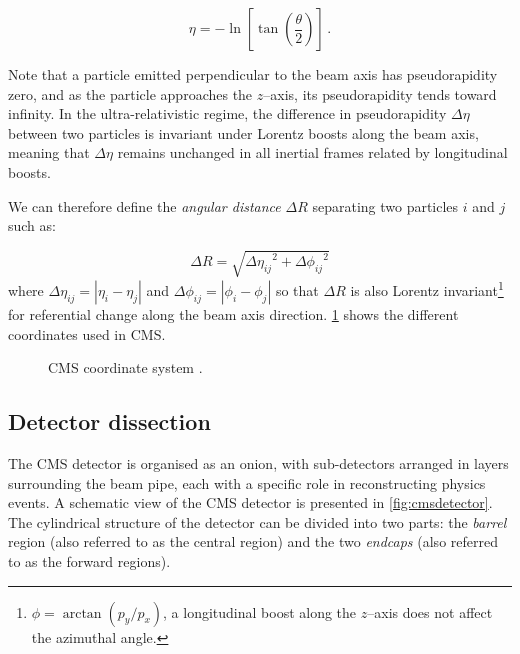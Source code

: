 \begin{equation}
    \eta = - \ln \left[ \tan \left( \frac{\theta}{2} \right) \right] \, .
    \label{eq:pseudorapidity}
\end{equation}

Note that a particle emitted perpendicular to the beam axis has pseudorapidity zero, and as the particle approaches the $z$--axis, its pseudorapidity tends toward infinity. In the ultra-relativistic regime, the difference in pseudorapidity $\Delta \eta$ between two particles is invariant under Lorentz boosts along the beam axis, meaning that $\Delta \eta$ remains unchanged in all inertial frames related by longitudinal boosts.

\vspace{0.5 cm}

We can therefore define the \textit{angular distance} $\Delta R$ separating two particles $i$ and $j$ such as:

\begin{equation}
    \Delta R = \sqrt{{\Delta \eta_{ij}}^2 + {\Delta \phi_{ij}}^2}
    \label{eq:deltaR}
\end{equation}  
where $\Delta \eta_{ij} = | \eta_i - \eta_j|$ and $\Delta \phi_{ij} = | \phi_i - \phi_j|$ so that $\Delta R$ is also Lorentz invariant\footnote{$\phi=\arctan(p_y/p_x)$, a longitudinal boost along the $z$--axis does not affect the azimuthal angle.} for referential change along the beam axis direction. \cref{fig:coordinate} shows the different coordinates used in CMS.

\begin{figure}[h!]
    \centering
    
    \caption{CMS coordinate system \cite{tikz}.}
    \label{fig:coordinate}
\end{figure}


\subsection{Detector dissection}

The CMS detector is organised as an onion, with sub-detectors arranged in layers surrounding the beam pipe, each with a specific role in reconstructing physics events. A schematic view of the CMS detector is presented in \cref{fig:cmsdetector}. The cylindrical structure of the detector can be divided into two parts: the \textit{barrel} region (also referred to as the central region) and the two \textit{endcaps} (also referred to as the forward regions).

